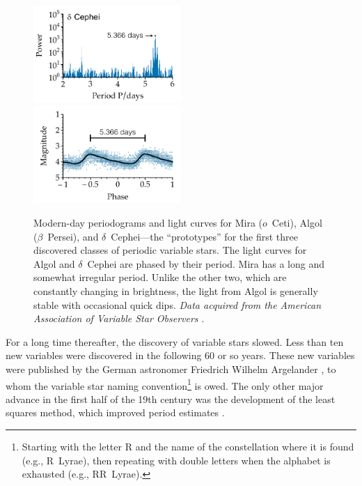 \begin{figure}[p]
    \vspace*{0.4cm}
    \includegraphics[width=0.5\textwidth]{figs/pgrams/dcep_pgram.pdf}%
    \includegraphics[width=0.5\textwidth]{figs/pgrams/dcep_phased.pdf}\\
    \vspace*{0.4cm}
    \caption[Light curves of the first-known periodic variable stars]{Modern-day periodograms and light curves for Mira ($o$~Ceti), Algol ($\beta$~Persei), and $\delta$~Cephei---the ``prototypes'' for the first three discovered classes of periodic variable stars. 
    The light curves for Algol and $\delta$~Cephei are phased by their period. 
    Mira has a long and somewhat irregular period. 
    Unlike the other two, which are constantly changing in brightness, the light from Algol is generally stable with occasional quick dips. 
    \emph{Data acquired from the American Association of Variable Star Observers} \citep[\textsc{AAVSO},][]{AAVSO}. 
    \label{fig:lightcurves}}
\end{figure}

For a long time thereafter, the discovery of variable stars slowed. 
Less than ten new variables were discovered in the following $60$ or so years. 
These new variables were published by the German astronomer Friedrich Wilhelm Argelander \citep{1844scja.book..122A}, to whom the variable star naming convention\footnote{ Starting with the letter R and the name of the constellation where it is found (e.g., R~Lyrae), then repeating with double letters when the alphabet is exhausted (e.g., RR~Lyrae).} is owed.
The only other major advance in the first half of the 19th century was the development of the least squares method, which improved period estimates \citep[e.g.,][]{1994JHA....25...92Z}. 

